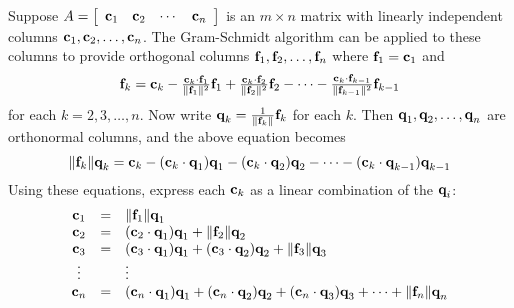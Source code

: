 Suppose $A = \left[ \begin{array}{cccc}
\textbf{c}_{1} & \textbf{c}_{2} & \cdots &  \textbf{c}_{n}
\end{array}\right]$ is an $m \times n$ matrix with linearly independent columns $\textbf{c}_{1}, \textbf{c}_{2}, \dots, \textbf{c}_{n}$. The Gram-Schmidt algorithm can be applied to these columns to provide orthogonal columns $\textbf{f}_{1}, \textbf{f}_{2}, \dots, \textbf{f}_{n}$ where $\textbf{f}_{1} = \textbf{c}_{1}$ and
\begin{equation*}
\textbf{f}_{k} = \textbf{c}_{k} - \tfrac{\textbf{c}_{k} \cdot \textbf{f}_{1}}{\| \textbf{f}_{1} \|^2}\textbf{f}_{1} + \tfrac{\textbf{c}_{k} \cdot \textbf{f}_{2}}{\| \textbf{f}_{2} \|^2}\textbf{f}_{2} - \dots - \tfrac{\textbf{c}_{k} \cdot \textbf{f}_{k-1}}{\| \textbf{f}_{k-1} \|^2}\textbf{f}_{k-1}
\end{equation*}
for each $k = 2, 3, \dots, n$. Now write $\textbf{q}_{k} = \tfrac{1}{\| \textbf{f}_{k} \|}\textbf{f}_{k}$ for each $k$. Then $\textbf{q}_{1}, \textbf{q}_{2}, \dots, \textbf{q}_{n}$ are orthonormal columns, and the above equation becomes
\begin{equation*}
\| \textbf{f}_{k} \| \textbf{q}_{k} = \textbf{c}_{k} - (\textbf{c}_{k} \cdot \textbf{q}_{1})\textbf{q}_{1} - (\textbf{c}_{k} \cdot \textbf{q}_{2})\textbf{q}_{2} - \dots - (\textbf{c}_{k} \cdot \textbf{q}_{k-1})\textbf{q}_{k-1}
\end{equation*}
Using these equations, express each $\textbf{c}_{k}$ as a linear combination of the $\textbf{q}_{i}$:
\begin{equation*}
\begin{array}{ccl}
\textbf{c}_{1} &=& \| \textbf{f}_{1} \| \textbf{q}_{1} \\
\textbf{c}_{2} &=& (\textbf{c}_{2} \cdot \textbf{q}_{1})\textbf{q}_{1} + \| \textbf{f}_{2} \| \textbf{q}_{2} \\
\textbf{c}_{3} &=& (\textbf{c}_{3} \cdot \textbf{q}_{1})\textbf{q}_{1} + (\textbf{c}_{3} \cdot \textbf{q}_{2})\textbf{q}_{2} + \| \textbf{f}_{3} \| \textbf{q}_{3} \\
\vdots && \vdots \\
\textbf{c}_{n} &=& (\textbf{c}_{n} \cdot \textbf{q}_{1})\textbf{q}_{1} + (\textbf{c}_{n} \cdot \textbf{q}_{2})\textbf{q}_{2} + (\textbf{c}_{n} \cdot \textbf{q}_{3})\textbf{q}_{3} + \dots + \| \textbf{f}_{n} \| \textbf{q}_{n} 
\end{array}
\end{equation*}
